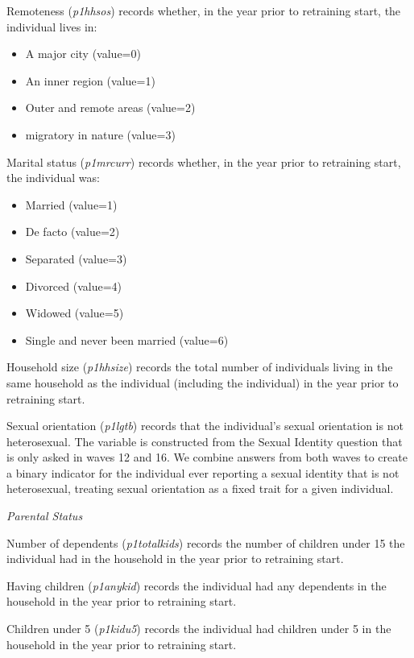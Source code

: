 \documentclass[12pt, a4paper]{article}
\begin{document}
Remoteness (\textit{p1\textunderscore{}hhsos}) records whether, in the year prior to retraining start, the individual lives in:
\begin{itemize}
  \item A major city (value=0)
  \item An inner region (value=1)
  \item Outer and remote areas (value=2) 
  \item migratory in nature (value=3)
\end{itemize}  

Marital status (\textit{p1\textunderscore{}mrcurr}) records whether, in the year prior to retraining start, the individual was:
\begin{itemize}
  \item Married (value=1)
  \item De facto (value=2)
  \item Separated (value=3)
  \item Divorced (value=4)
  \item Widowed (value=5)
  \item Single and never been married (value=6)
\end{itemize}  

Household size (\textit{p1\textunderscore{}hhsize}) records the total number of individuals living in the same household as the individual (including the individual) in the year prior to retraining start.

Sexual orientation (\textit{p1\textunderscore{}lgtb}) records that the individual’s sexual orientation is not heterosexual.  The variable is constructed from the Sexual Identity question that is only asked in waves 12 and 16. We combine answers from both waves to create a binary indicator for the individual ever reporting a sexual identity that is not heterosexual, treating sexual orientation as a fixed trait for a given individual. 
  
\emph{Parental Status}

Number of dependents (\textit{p1\textunderscore{}totalkids}) records the number of children under 15 the individual had in the household in the year prior to retraining start. 

Having children (\textit{p1\textunderscore{}anykid}) records the individual had any dependents in the household in the year prior to retraining start. 

Children under 5 (\textit{p1\textunderscore{}kidu5}) records the individual had children under 5 in the household in the year prior to retraining start. 
\end{document}
